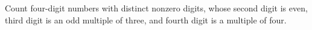Count four-digit numbers with distinct nonzero digits, whose second digit is even, third digit is an odd multiple of three, and fourth digit is a multiple of four.
